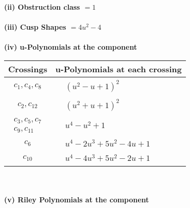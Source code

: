 \documentclass[1p]{elsarticle_modified}
\theoremstyle{definition}
\begin{document}
\flushleft \textbf{(ii) Obstruction class $= 1$}\\~\\
\flushleft \textbf{(iii) Cusp Shapes $= 4 u^2-4$}\\~\\
\newpage\renewcommand{\arraystretch}{1}
\flushleft \textbf{(iv) u-Polynomials at the component}\newline \\
\begin{tabular}{m{50pt}|m{274pt}}
Crossings & \hspace{64pt}u-Polynomials at each crossing \\
\hline $$\begin{aligned}c_{1},c_{4},c_{8}\end{aligned}$$&$\begin{aligned}
&(u^2- u+1)^2
\end{aligned}$\\
\hline $$\begin{aligned}c_{2},c_{12}\end{aligned}$$&$\begin{aligned}
&(u^2+u+1)^2
\end{aligned}$\\
\hline $$\begin{aligned}c_{3},c_{5},c_{7}\\c_{9},c_{11}\end{aligned}$$&$\begin{aligned}
&u^4- u^2+1
\end{aligned}$\\
\hline $$\begin{aligned}c_{6}\end{aligned}$$&$\begin{aligned}
&u^4-2 u^3+5 u^2-4 u+1
\end{aligned}$\\
\hline $$\begin{aligned}c_{10}\end{aligned}$$&$\begin{aligned}
&u^4-4 u^3+5 u^2-2 u+1
\end{aligned}$\\
\hline
\end{tabular}\\~\\
\newpage\renewcommand{\arraystretch}{1}
\flushleft \textbf{(v) Riley Polynomials at the component}\newline \\
\end{document}
